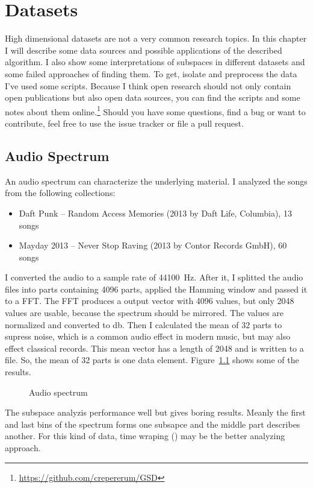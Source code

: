\chapter{Datasets}
High dimensional datasets are not a very common research topics. In this chapter I will describe some data sources and possible applications of the described algorithm. I also show some interpretations of subspaces in different datasets and some failed approaches of finding them. To get, isolate and preprocess the data I've used some scripts. Because I think open research should not only contain open publications but also open data sources, you can find the scripts and some notes about them online.\footnote{\url{https://github.com/crepererum/GSD}} Should you have some questions, find a bug or want to contribute, feel free to use the issue tracker or file a pull request.

\section{Audio Spectrum}
An audio spectrum can characterize the underlying material. I analyzed the songs from the following collections:
\begin{itemize}
	\item Daft Punk -- Random Access Memories (2013 by Daft Life, Columbia), \num{13} songs
	\item Mayday 2013 -- Never Stop Raving (2013 by Contor Records GmbH), \num{60} songs
\end{itemize}
I converted the audio to a sample rate of \SI{44100}{\hertz}. After it, I splitted the audio files into parts containing \num{4096} parts, applied the Hamming window and passed it to a FFT. The FFT produces a output vector with \num{4096} values, but only \num{2048} values are usable, because the spectrum should be mirrored. The values are normalized and converted to \si{\decibel}. Then I calculated the mean of \num{32} parts to supress noise, which is a common audio effect in modern music, but may also effect classical records. This mean vector has a length of \num{2048} and is written to a file. So, the mean of \num{32} parts is one data element. Figure~\ref{fig:audio} shows some of the results.
\begin{figure}
	
	\caption{Audio spectrum}
	\label{fig:audio}
\end{figure}

The subspace analyzis performance well but gives boring results. Meanly the first and last bins of the spectrum forms one subsapce and the middle part describes another. For this kind of data, time wraping (\cite{timeWraping}) may be the better analyzing approach.

